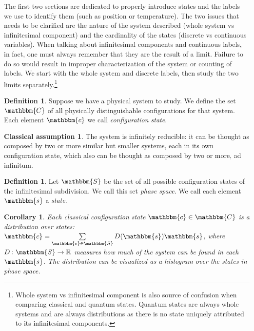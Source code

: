 \documentclass[aps,pra,10pt,twocolumn,floatfix,nofootinbib]{revtex4-1}
\newtheorem{cor}[thm]{Corollary}
\theoremstyle{definition}
\newtheorem{defn}[thm]{Definition}
\newtheorem*{assump1}{Classical assumption}
\begin{document}
The first two sections are dedicated to properly introduce states and the labels we use to identify them (such as position or temperature). The two issues that needs to be clarified are the nature of the system described (whole system vs infinitesimal component) and the cardinality of the states (discrete vs continuous variables). When talking about infinitesimal components and continuous labels, in fact, one must always remember that they are the result of a limit. Failure to do so would result in improper characterization of the system or counting of labels. We start with the whole system and discrete labels, then study the two limits separately.\footnote{Whole system vs infinitesimal component is also source of confusion when comparing classical and quantum states. Quantum states are always whole systems and are always distributions as there is no state uniquely attributed to its infinitesimal components.}

\begin{defn}\label{statedef}
Suppose we have a physical system to study. We define the set $\mathbbm{C}$ of all physically distinguishable configurations for that system. Each element $\mathbbm{c}$ we call \emph{configuration state}.
\end{defn}

\begin{assump1}\label{classical}
The system is infinitely reducible: it can be thought as composed by two or more similar but smaller systems, each in its own configuration state, which also can be thought as composed by two or more, ad infinitum.
\end{assump1}

\begin{defn}\label{classicalPhaseSpace}
Let $\mathbbm{S}$ be the set of all possible configuration states of the infinitesimal subdivision. We call this set \emph{phase space}. We call each element $\mathbbm{s}$ a \emph{state}.
\end{defn}

\begin{cor}\label{classicalDistribution}
Each classical configuration state $\mathbbm{c} \in \mathbbm{C}$ is a distribution over states: $\mathbbm{c}=\sum\limits_{\mathbbm{s} \in \mathbbm{S}} D(\mathbbm{s}) \mathbbm{s}$, where $D:\mathbbm{S}\rightarrow\mathbb{R}$ measures how much of the system can be found in each $\mathbbm{s}$. The distribution can be visualized as a histogram over the states in phase space.
\end{cor}
\end{document}
